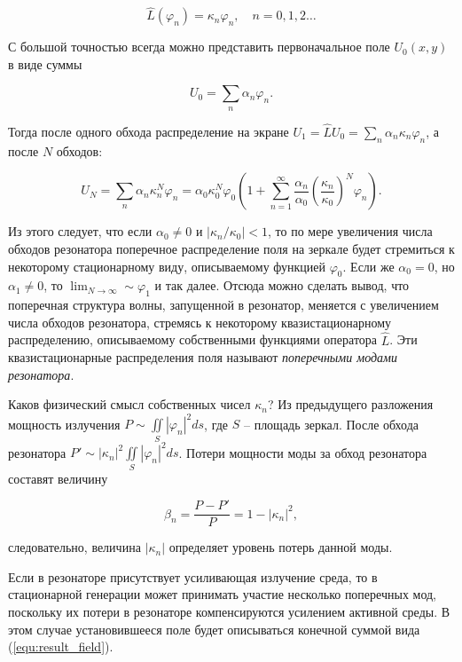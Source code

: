 \documentclass[a4paper,12pt]{article}
\begin{document}
\begin{equation}
    \hat{L}(\varphi_n) = \kappa_n \varphi_n,\quad n = 0, 1, 2\dots
\end{equation}

С большой точностью всегда можно представить первоначальное поле $U_0 (x,y)$ в виде суммы

\begin{equation}
    U_0 = \sum_n \alpha_n \varphi_n.
\end{equation}

Тогда после одного обхода распределение на экране $U_1 = \hat{L}U_0 = \sum_n \alpha_n \kappa_n \varphi_n$, а после $N$ обходов:

\begin{equation}
    U_N = \sum_n \alpha_n \kappa_n^N \varphi_n = \alpha_0 \kappa_0^N \varphi_0 (1 + \sum_{n = 1}^{\infty} \frac{\alpha_n}{\alpha_0}(\frac{\kappa_n}{\kappa_0})^N \varphi_n).
    \label{equ:result_field}
\end{equation}

Из этого следует, что если $\alpha_0 \ne 0$ и $|\kappa_n/\kappa_0| < 1$, то по мере увеличения числа обходов резонатора поперечное распределение поля на зеркале будет стремиться к некоторому стационарному виду, описываемому функцией $\varphi_0$. Если же $\alpha_0 = 0$, но $\alpha_1 \ne 0$, то $\lim_{N\to\infty} \sim \varphi_1$ и так далее. Отсюда можно сделать вывод, что поперечная структура волны, запущенной в резонатор, меняется с увеличением числа обходов резонатора, стремясь к некоторому квазистационарному распределению, описываемому собственными функциями оператора $\hat{L}$. Эти квазистационарные распределения поля называют \textit{поперечными модами резонатора}.

Каков физический смысл собственных чисел $\kappa_n$? Из предыдущего разложения мощность излучения $P \sim \iint\limits_S |\varphi_n|^2 ds$, где $S$ -- площадь зеркал. После обхода резонатора $P' \sim |\kappa_n|^2 \iint\limits_S |\varphi_n|^2 ds$. Потери мощности моды за обход резонатора составят величину

\begin{equation}
    \beta_n = \frac{P - P'}{P} = 1 - |\kappa_n|^2,
\end{equation}

следовательно, величина $|\kappa_n|$ определяет уровень потерь данной моды.

Если в резонаторе присутствует усиливающая излучение среда, то в стационарной генерации может принимать участие несколько поперечных мод, поскольку их потери в резонаторе компенсируются усилением активной среды. В этом случае установившееся поле будет описываться конечной суммой вида (\ref{equ:result_field}).
\end{document}
